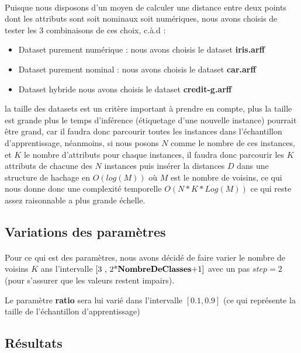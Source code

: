 			\paragraph{}
			Puisque nous disposons d'un moyen de calculer une distance entre deux points dont les attributs sont soit nominaux soit numériques, nous avons choisis de tester les 3 combinaisons de ces choix, c.à.d : 
			\begin{itemize}
				\item Dataset purement numérique : nous avons choisis le dataset \textbf{iris.arff}
				\item Dataset purement nominal : nous avons choisis le dataset \textbf{car.arff}
				\item Dataset hybride nous avons choisis le dataset \textbf{credit-g.arff}
			\end{itemize}
			\par la taille des datasets est un critère important à prendre en compte, plus la taille est grande plus le temps d'inférence (étiquetage d'une nouvelle instance) pourrait être grand, car il faudra donc parcourir toutes les instances dans l'échantillon d'apprentissage, néanmoins, si nous posons $N$ comme le nombre de ces instances, et $K$ le nombre d'attributs pour chaque instances, il faudra donc parcourir les $K$ attributs de chacune des $N$ instances puis insérer la distances $D$ dans une structure de hachage en $O(log(M))$ où $M$ est le nombre de voisins, ce qui nous donne donc une complexité temporelle $O(N*K*Log(M))$ ce qui reste assez raisonnable a plus grande échelle.
		\subsection{Variations des paramètres}
			\paragraph{}
			Pour ce qui est des paramètres, nous avons décidé de faire varier le nombre de voisins $K$ ans l'intervalle $\left[ \text{3 , 2*\textbf{NombreDeClasses}+1}\right]$ avec un pas $step = 2$ (pour s'assurer que les valeurs restent impairs).
			\par 
			Le paramètre \textbf{ratio} sera lui varié dans l'intervalle $\left[ 0.1 ,0.9 \right]$ (ce qui représente la taille de l'échantillon d'apprentissage)
		\subsection{Résultats}
